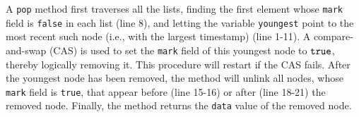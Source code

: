 A {\tt pop} method first traverses all the lists, finding
the first element whose {\tt mark} field is {\tt false} in each list (line 8), and letting the variable {\tt youngest} point to the most recent such node
(i.e., with the largest timestamp) (line 1-11).
A compare-and-swap (CAS) is used
to set the {\tt mark} field of this youngest node to ${\tt true}$,
thereby logically removing it.
This procedure will restart if the CAS fails. After the youngest node has been removed, the method will unlink all nodes, whose {\tt mark} field is {\tt true},
that appear before (line 15-16) or after (line 18-21) the removed node.
Finally, the method returns the {\tt data} value of the removed node.

